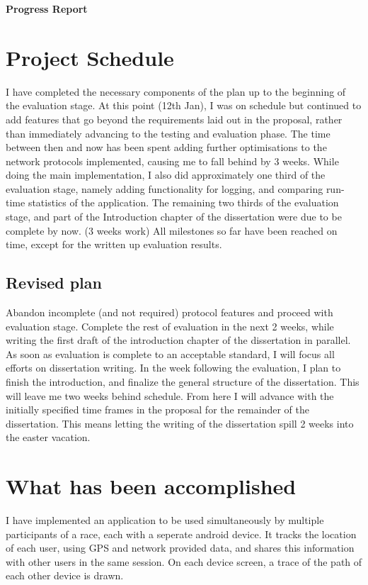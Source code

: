 \documentclass{article}
\begin{document}
\huge{\bf Progress Report}

\normalsize
\section*{Project Schedule}

I have completed the necessary components of the plan up to the beginning of the evaluation stage.
At this point (12th Jan), I was on schedule but continued to add features that go beyond the requirements laid out in the proposal, rather than immediately advancing to the testing and evaluation phase. The time between then and now has been spent adding further optimisations to the network protocols implemented, causing me to fall behind by 3 weeks.
While doing the main implementation, I also did approximately one third of the evaluation stage, namely adding functionality for logging, and comparing run-time statistics of the application. The remaining two thirds of the evaluation stage, and part of the Introduction chapter of the dissertation were due to be complete by now. (3 weeks work)
All milestones so far have been reached on time, except for the written up evaluation results.

\subsection*{Revised plan}
Abandon incomplete (and not required) protocol features and proceed with evaluation stage.
Complete the rest of evaluation in the next 2 weeks, while writing the first draft of the introduction chapter of the dissertation in parallel.
As soon as evaluation is complete to an acceptable standard, I will focus all efforts on dissertation writing.
In the week following the evaluation, I plan to finish the introduction, and finalize the general structure of the dissertation.
This will leave me two weeks behind schedule.
From here I will advance with the initially specified time frames in the proposal for the remainder of the dissertation. This means letting the writing of the dissertation spill 2 weeks into the easter vacation.

\section*{What has been accomplished}

I have implemented an application to be used simultaneously by multiple participants of a race, each with a seperate android device. It tracks the location of each user, using GPS and network provided data, and shares this information with other users in the same session. On each device screen, a trace of the path of each other device is drawn.
\end{document}
